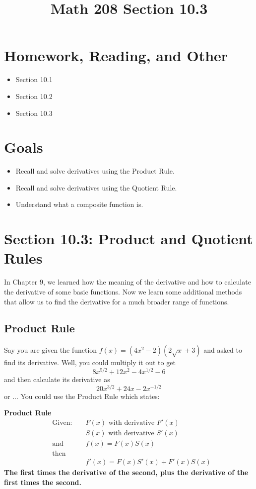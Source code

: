 \documentclass[14pt]{extarticle}
\title{\vspace{-5ex}Math 208 Section 10.3}
\date{\vspace{-10ex}}
\begin{document}
	\maketitle		
	\section*{Homework, Reading, and Other}
	\begin{itemize}
		\item Section 10.1
		\item Section 10.2
		\item Section 10.3
	\end{itemize}

\section{Goals}
\begin{itemize}
	\item Recall and solve derivatives using the Product Rule.
	\item Recall and solve derivatives using the Quotient Rule.
	\item Understand what a composite function is.
\end{itemize}

\section{Section 10.3: Product and Quotient Rules}
In Chapter 9, we learned how the meaning of the derivative and how to calculate the derivative of some basic functions. Now we learn some additional methods that allow us to find the derivative for a much broader range of functions.

\subsection*{Product Rule}

Say you are given the function $f(x) = (4x^2 -2)(2\sqrt{x}+3)$ and asked to find its derivative. Well, you could multiply it out to get $$8x^{5/2} + 12x^2 - 4x^{1/2} - 6$$
and then calculate its derivative as $$20x^{3/2}+ 24x - 2x^{-1/2}$$ or ... You could use the Product Rule which states: 

\begin{tcolorbox}[enhanced jigsaw,colback=bg,boxrule=0pt,arc=0pt]
	\textbf{Product Rule}
	\begin{align*}
		&\text{Given: } & &F(x) \text{ with derivative } F'(x) \\
		& & &S(x) \text{ with derivative } S'(x) \\
		&\text{and } & &f(x) = F(x)S(x) \\
		&\text{then }\\
		& & &f'(x) = F(x)S'(x) + F'(x)S(x)
	\end{align*}
\textbf{The first times the derivative of the second, plus the derivative of the first times the second.}
\end{tcolorbox}
\end{document}
